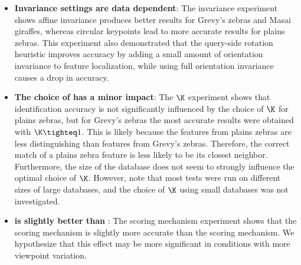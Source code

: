 \begin{itemize}
            \item \textbf{Invariance settings are data dependent}:
                The invariance experiment shows
                affine invariance produces better results for Grevy's
                  zebras and Masai giraffes, whereas circular keypoints
                  lead to more accurate results for plains zebras.
                This experiment also demonstrated that the query-side
                  rotation heuristic improves accuracy by adding a small
                  amount of orientation invariance to feature
                  localization, while using full orientation invariance
                  causes a drop in accuracy.

              \item \textbf{The choice of \K{} has a minor impact}: 
                The $\K$ experiment shows that identification accuracy
                  is not significantly influenced by the choice of $\K$
                  for plains zebras, but for Grevy's zebras the most
                  accurate results were obtained with $\K\tighteq1$.
                This is likely because the features from plains zebras
                  are less distinguishing than features from Grevy's
                  zebras.
                Therefore, the correct match of a plains zebra feature
                  is less likely to be its closest neighbor.
                Furthermore, the size of the database does not seem to
                  strongly influence the optimal choice of $\K$.
                However, note that most tests were run on different
                  sizes of large databases, and the choice of $\K$ using
                  small databases was not investigated.

              \item \textbf{\Nsumprefix{} is slightly better than \csumprefix{} \namescoring{}}:
                The scoring mechanism experiment shows that the
                  \nsumprefix{} scoring mechanism is slightly more
                  accurate than the \csumprefix{} scoring mechanism.
                We hypothesize that this effect may be more significant
                  in conditions with more viewpoint variation.


\end{itemize}
